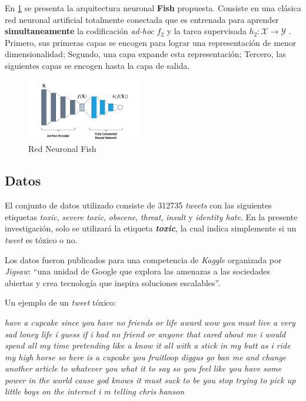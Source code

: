 En \ref{fig:fish} se presenta la arquitectura neuronal \textbf{Fish} propuesta. Consiste en una clásica red neuronal artificial totalmente conectada que es entrenada para aprender \textbf{simultaneamente} la codificación \textit{ad-hoc} $f_2$ y la tarea supervisada $h_2\colon \mathcal{X} \rightarrow \mathcal{Y}$ . Primero, sus primeras capas se encogen para lograr una representación de menor dimensionalidad; Segundo, una capa expande esta representación; Tercero, las siguientes capas se encogen hasta la capa de salida.

\begin{figure}[h] %
\centering
\includegraphics[width=0.45\textwidth]{fish}
\caption{\label{fig:fish} Red Neuronal Fish}
\end{figure}

\subsection{Datos}

El conjunto de datos utilizado consiste de 312735 \textit{tweets} con las siguientes etiquetas \textit{toxic}, \textit{severe toxic}, \textit{obscene}, \textit{threat}, \textit{insult} y \textit{identity hate}. En la presente investigación, solo se utilizará la etiqueta \textbf{\textit{toxic}}, la cual indica simplemente si un \textit{tweet} es tóxico o no.

Los datos fueron publicados para una competencia de \textit{Kaggle} \cite{jigsaw-toxic-comment-classification-challenge} organizada por \textit{Jigsaw}: ``una unidad de Google que explora las amenazas a las sociedades abiertas y crea tecnología que inspira soluciones escalables''.

Un ejemplo de un \textit{tweet} tóxico: 

\textit{have a cupcake since you have no friends or life award wow you must live a very sad loney life i guess if i had no friend or anyone that cared about me i would spend all my time pretending like a know it all with a stick in my butt as i ride my high horse so here is a cupcake you fruitloop diggus go ban me and change another article to whatever you what it to say so you feel like you have some power in the world cause god knows it must suck to be you stop trying to pick up little boys on the internet i m telling chris hanson}


